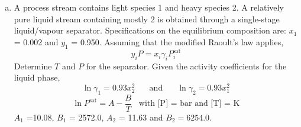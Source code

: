 \documentclass[calculator,steamtables,datasheet,solutions]{exam}
\newcommand{\frc}{\displaystyle\frac}
\begin{document}
\begin{question}
%
\begin{enumerate}[(a)]

\item\label{Tut05P2} A process stream contains light species 1 and heavy species 2. A relatively pure liquid stream containing mostly 2 is obtained through a single-stage liquid/vapour separator. Specifications on the equilibrium composition are: $x_{1}$ = 0.002 and $y_{1}$ = 0.950. Assuming that the modified Raoult's law applies, 
\begin{displaymath}
  y_{i} P = x_{i}\gamma_{i}P_{i}^{\text{sat}}
\end{displaymath} 
Determine $T$ and $P$ for the separator. Given the activity coefficients for the liquid phase,~
\begin{displaymath}
\ln\gamma_{1} = 0.93x_{2}^{2} \;\;\;\;\;\text{ and }\;\;\;\;\;\ln\gamma_{2}=0.93x_{1}^{2}
\end{displaymath}
\begin{displaymath}
\ln P^{\text{sat}} = A - \frc{B}{T}\;\;\;\text{with [P] = bar and [T] = K}
\end{displaymath} 
$A_{1}$ =10.08, $B_{1}$ = 2572.0, $A_{2}$ = 11.63 and $B_{2}=6254.0$.

\end{enumerate}

\end{question}



\clearpage
\end{document}
